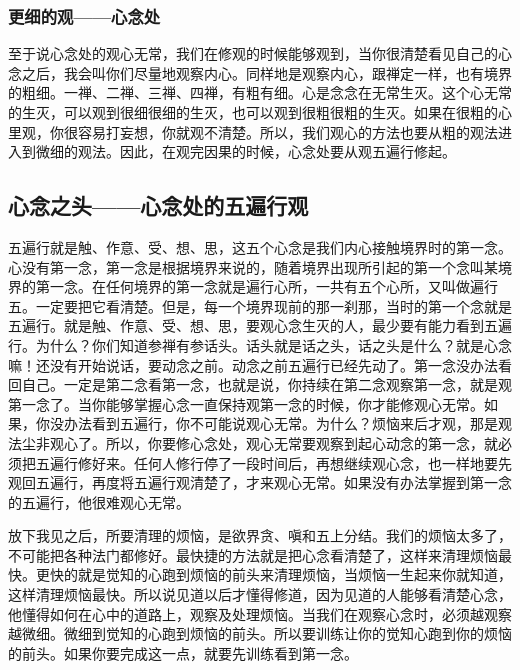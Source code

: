 \documentclass{book}
\begin{document}
\subsubsection{更细的观——心念处}

至于说心念处的观心无常，我们在修观的时候能够观到，当你很清楚看见自己的心念之后，我会叫你们尽量地观察内心。同样地是观察内心，跟禅定一样，也有境界的粗细。一禅、二禅、三禅、四禅，有粗有细。心是念念在无常生灭。这个心无常的生灭，可以观到很细很细的生灭，也可以观到很粗很粗的生灭。如果在很粗的心里观，你很容易打妄想，你就观不清楚。所以，我们观心的方法也要从粗的观法进入到微细的观法。因此，在观完因果的时候，心念处要从观五遍行修起。

\subsection{心念之头——心念处的五遍行观}

五遍行就是触、作意、受、想、思，这五个心念是我们内心接触境界时的第一念。心没有第一念，第一念是根据境界来说的，随着境界出现所引起的第一个念叫某境界的第一念。在任何境界的第一念就是遍行心所，一共有五个心所，又叫做遍行五。一定要把它看清楚。但是，每一个境界现前的那一刹那，当时的第一个念就是五遍行。就是触、作意、受、想、思，要观心念生灭的人，最少要有能力看到五遍行。为什么？你们知道参禅有参话头。话头就是话之头，话之头是什么？就是心念嘛！还没有开始说话，要动念之前。动念之前五遍行已经先动了。第一念没办法看回自己。一定是第二念看第一念，也就是说，你持续在第二念观察第一念，就是观第一念了。当你能够掌握心念一直保持观第一念的时候，你才能修观心无常。如果，你没办法看到五遍行，你不可能说观心无常。为什么？烦恼来后才观，那是观法尘非观心了。所以，你要修心念处，观心无常要观察到起心动念的第一念，就必须把五遍行修好来。任何人修行停了一段时间后，再想继续观心念，也一样地要先观回五遍行，再度将五遍行观清楚了，才来观心无常。如果没有办法掌握到第一念的五遍行，他很难观心无常。

放下我见之后，所要清理的烦恼，是欲界贪、嗔和五上分结。我们的烦恼太多了，不可能把各种法门都修好。最快捷的方法就是把心念看清楚了，这样来清理烦恼最快。更快的就是觉知的心跑到烦恼的前头来清理烦恼，当烦恼一生起来你就知道，这样清理烦恼最快。所以说见道以后才懂得修道，因为见道的人能够看清楚心念，他懂得如何在心中的道路上，观察及处理烦恼。当我们在观察心念时，必须越观察越微细。微细到觉知的心跑到烦恼的前头。所以要训练让你的觉知心跑到你的烦恼的前头。如果你要完成这一点，就要先训练看到第一念。
\end{document}
